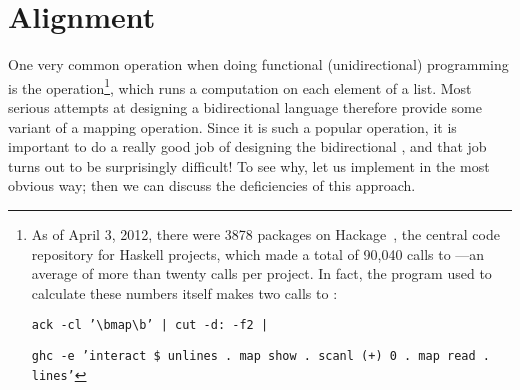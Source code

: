 \section{Alignment}
\label{sec:intro-alignment}
One very common operation when doing functional (unidirectional) programming
is the \map operation\footnote{As of April 3, 2012, there were 3878 packages
on Hackage~\cite{Hackage2012}, the central code repository for Haskell
projects, which made a total of 90,040 calls to \map---an average of more
than twenty calls per project. In fact, the program used to calculate these
numbers itself makes two calls to \map:

\noindent\texttt{ack -cl '\textbackslash bmap\textbackslash b' | cut -d: -f2 |}

\noindent\texttt{ghc -e 'interact \$ unlines . map show . scanl (+) 0 . map read . lines'}
}, which runs a computation on each element of a list. Most serious attempts
at designing a bidirectional language therefore provide some variant of a
mapping operation. Since it is such a popular operation, it is important to
do a really good job of designing the bidirectional \map, and that job turns
out to be surprisingly difficult! To see why, let us implement \map in the
most obvious way; then we can discuss the deficiencies of this approach.

